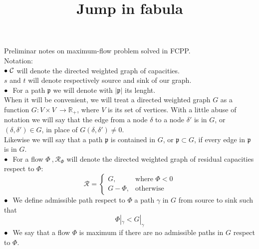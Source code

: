 \documentclass{article}
\title{Jump in fabula}
\author{}
\date{}
\theoremstyle{plain}
\theoremstyle{definition}
\theoremstyle{remark}
\begin{document}
Preliminar notes on maximum-flow problem solved in FCPP.\\
Notation:\\
 $\small\bullet\ \mathcal{C}$ will denote the directed weighted graph of capacities.\\
 $s$ and $t$ will denote respectively source and sink of our graph.\\
 $\small\bullet\ $  For a path $\mathfrak{p}$ we will denote with $|\mathfrak{p}|$ its lenght.\\

When it will be convenient, we will treat a directed weighted graph $G$ as a function $G: V\times V\ \rightarrow \mathbb{R_{+}}$, where $V$ is its set of vertices. With a little abuse of notation we will say that the edge from a node $\delta$ to a node $\delta'$ is in $G$, or $(\delta, \delta') \in G$,  in place of $G(\delta, \delta') \not= 0$.\\
Likewise we will say that a path $\mathfrak{p}$ is contained in $G$, or $\mathfrak{p}\subset G$, if every edge in $\mathfrak{p}$ is in $G$.\\

 $\small\bullet\ $ For a flow $\Phi\ , \mathcal{R}_{\Phi}$ will denote the directed weighted graph of residual capacities respect to $\Phi$:
\begin{equation}
\label{eq:residual-capacity}
\mathcal{R} =
\begin{cases}
    G,& \text{where } \Phi< 0\\
    G-\Phi,              & \text{otherwise}
\end{cases}
\end{equation}
$\small\bullet\ $  We define admissible path respect to $\Phi$  a path $\gamma$ in $G$ from source to sink such that 
\begin{equation*}
\Phi|_{\gamma} < G|_{\gamma}
\end{equation*}
$\small\bullet\ $ We say that a flow $\Phi$ is maximum if there are no admissible paths in $G$ respect to $\Phi$.
\end{document}
